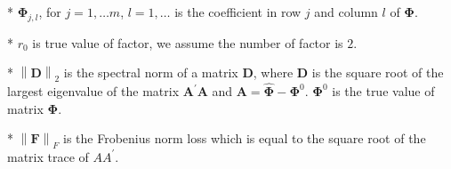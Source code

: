\documentclass[12pt,a4paper,hyperref]{article}
\begin{document}
\begin{table}[H]
\begin{threeparttable}
\begin{tablenotes}
\footnotesize
  \item[*] $\boldsymbol{\Phi}_{j,l}$, for $j=1,\ldots m$, $l=1,\ldots$ is the coefficient in row $j$ and column $l$ of $\boldsymbol{\Phi}$.
\item[*] $r_{0}$ is true value of factor, we assume the number of factor is $2$.
 \item[*] $\left\| \boldsymbol{D} \right\|_{2}$ is the spectral norm of a matrix $\boldsymbol{D}$, where $\boldsymbol{D}$ is the square root of the largest eigenvalue of the matrix $\boldsymbol{A}^{'}\boldsymbol{A}$ and $\boldsymbol{A}=\hat{\boldsymbol{\Phi}}- \boldsymbol{\Phi}^{0}$. $\boldsymbol{\Phi}^{0}$ is the true value of matrix $\boldsymbol{\Phi}$.
 \item[*] $\left\| \boldsymbol{F} \right\|_{F} $ is the Frobenius norm loss which is equal to the square root of the matrix trace of $AA^{'}$.
    \end{tablenotes}
\end{threeparttable}
\end{table}
\end{document}
